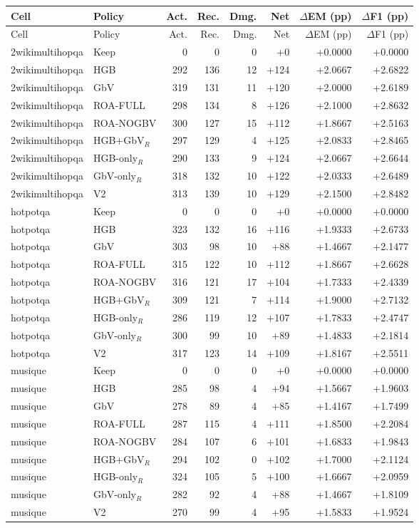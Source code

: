 \begin{longtable}{llrrrrrr}
\toprule
Cell & Policy & Act. & Rec. & Dmg. & Net & $\Delta$EM (pp) & $\Delta$F1 (pp) \\
\midrule
\endfirsthead
\toprule
Cell & Policy & Act. & Rec. & Dmg. & Net & $\Delta$EM (pp) & $\Delta$F1 (pp) \\
\midrule
\endhead
2wikimultihopqa & Keep & 0 & 0 & 0 & +0 & +0.0000 & +0.0000 \\
2wikimultihopqa & HGB & 292 & 136 & 12 & +124 & +2.0667 & +2.6822 \\
2wikimultihopqa & GbV & 319 & 131 & 11 & +120 & +2.0000 & +2.6189 \\
2wikimultihopqa & ROA-FULL & 298 & 134 & 8 & +126 & +2.1000 & +2.8632 \\
2wikimultihopqa & ROA-NOGBV & 300 & 127 & 15 & +112 & +1.8667 & +2.5163 \\
2wikimultihopqa & HGB+GbV$_R$ & 297 & 129 & 4 & +125 & +2.0833 & +2.8465 \\
2wikimultihopqa & HGB-only$_R$ & 290 & 133 & 9 & +124 & +2.0667 & +2.6644 \\
2wikimultihopqa & GbV-only$_R$ & 318 & 132 & 10 & +122 & +2.0333 & +2.6489 \\
2wikimultihopqa & V2 & 313 & 139 & 10 & +129 & +2.1500 & +2.8482 \\
hotpotqa & Keep & 0 & 0 & 0 & +0 & +0.0000 & +0.0000 \\
hotpotqa & HGB & 323 & 132 & 16 & +116 & +1.9333 & +2.6733 \\
hotpotqa & GbV & 303 & 98 & 10 & +88 & +1.4667 & +2.1477 \\
hotpotqa & ROA-FULL & 315 & 122 & 10 & +112 & +1.8667 & +2.6628 \\
hotpotqa & ROA-NOGBV & 316 & 121 & 17 & +104 & +1.7333 & +2.4339 \\
hotpotqa & HGB+GbV$_R$ & 309 & 121 & 7 & +114 & +1.9000 & +2.7132 \\
hotpotqa & HGB-only$_R$ & 286 & 119 & 12 & +107 & +1.7833 & +2.4747 \\
hotpotqa & GbV-only$_R$ & 300 & 99 & 10 & +89 & +1.4833 & +2.1814 \\
hotpotqa & V2 & 317 & 123 & 14 & +109 & +1.8167 & +2.5511 \\
musique & Keep & 0 & 0 & 0 & +0 & +0.0000 & +0.0000 \\
musique & HGB & 285 & 98 & 4 & +94 & +1.5667 & +1.9603 \\
musique & GbV & 278 & 89 & 4 & +85 & +1.4167 & +1.7499 \\
musique & ROA-FULL & 287 & 115 & 4 & +111 & +1.8500 & +2.2084 \\
musique & ROA-NOGBV & 284 & 107 & 6 & +101 & +1.6833 & +1.9843 \\
musique & HGB+GbV$_R$ & 294 & 102 & 0 & +102 & +1.7000 & +2.1124 \\
musique & HGB-only$_R$ & 324 & 105 & 5 & +100 & +1.6667 & +2.0959 \\
musique & GbV-only$_R$ & 282 & 92 & 4 & +88 & +1.4667 & +1.8109 \\
musique & V2 & 270 & 99 & 4 & +95 & +1.5833 & +1.9524 \\
\bottomrule
\end{longtable}
